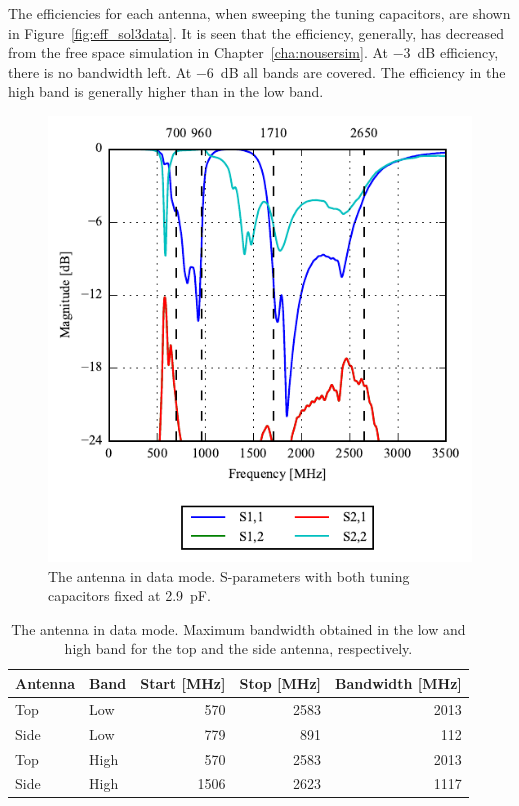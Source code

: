 The efficiencies for each antenna, when sweeping the tuning capacitors, are shown in Figure~\ref{fig:eff_sol3data}. It is seen that the efficiency, generally, has decreased from the free space simulation in Chapter~\ref{cha:nousersim}. At  \SI{-3}{dB} efficiency, there is no bandwidth left. At \SI{-6}{dB} all bands are covered. The efficiency in the high band is generally higher than in the low band.

\begin{figure}[htbp]
    \centering
    \includegraphics{img/tech_sol/nonresonant/simulation/data_mode/s_params_cMax.pdf}
    \caption{The antenna in data mode. S-parameters with both tuning capacitors fixed at \SI{2.9}{pF}.}
    \label{fig:ant3_sparam_data}
\end{figure}

\begin{table}[htbp]
    \centering
    \begin{tabular}{|l|l|r|r|r|}
        \hline
        Antenna & Band & Start [MHz] & Stop [MHz] & Bandwidth [MHz] \\
        \hline
        Top     & Low  & 570         & 2583       & 2013 \\
        Side    & Low  & 779         & 891        & 112  \\
        \hline
        Top     & High & 570         & 2583       & 2013 \\
        Side    & High & 1506        & 2623       & 1117 \\
        \hline
    \end{tabular}
    \caption{The antenna in data mode. Maximum bandwidth obtained in the low and high band for the top and the side antenna, respectively.}
    \label{tab:bw_sol3data}
\end{table}

